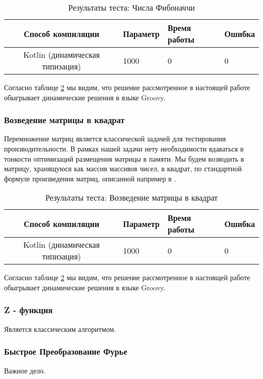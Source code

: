 \begin{table}[h]
\caption{\label{tab:fibBenchResults}Результаты теста: Числа Фибоначчи}
\begin{center}
\begin{tabular}{|c|l|l|l|}
\hline
Способ компиляции & Параметр	& Время работы & Ошибка \\
\hline
Kotlin (динамическая типизация) & 1000 & 0 & 0 \\
\hline
\end{tabular}
\end{center}
\end{table} 


Согласно таблице \ref{tab:fibBenchResults} мы видим, что решение рассмотренное в настоящей работе обыгрывает динамические решения в языке Groovy.


\subsubsection{Возведение матрицы в квадрат}

Перемножение матриц является классической задачей для тестирования производительности. В рамках нашей задачи нету необходимости вдаваться в тонкости оптимизаций размещения матрицы в памяти. Мы будем возводить в матрицу, хранящуюся как массив массивов чисел, в квадрат, по стандартной формуле произведения матриц, описанной например в \cite{book:KryakvinVadimDLinAlgebra}. 

\begin{table}[h]
\caption{\label{tab:fibBenchResults}Результаты теста: Возведение матрицы в квадрат}
\begin{center}
\begin{tabular}{|c|l|l|l|}
\hline
Способ компиляции & Параметр	& Время работы & Ошибка \\
\hline
Kotlin (динамическая типизация) & 1000 & 0 & 0 \\
\hline
\end{tabular}
\end{center}
\end{table} 


Согласно таблице \ref{tab:fibBenchResults} мы видим, что решение рассмотренное в настоящей работе обыгрывает динамические решения в языке Groovy.

\subsubsection{Z - функция}

Является классическим алгоритмом.

\subsubsection{Быстрое Преобразование Фурье}

Важное дело.